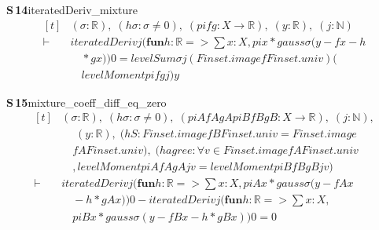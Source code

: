 \documentclass[conference]{IEEEtran}
\theoremstyle{definition}
\newcommand{\lean}[1]{\textsf{\footnotesize #1}}
\begin{document}
\noindent\textbf{S\,14}\quad\lean{iteratedDeriv\_mixture}
{\footnotesize\[ \begin{aligned}[t]
&(\sigma : \mathbb{R} ),\; (\mathit{hσ} : \sigma \neq 0),\; (\mathit{pi} \mathit{f} \mathit{g} : \mathit{X} \to \mathbb{R} ),\; (\mathit{y} : \mathbb{R} ),\; (\mathit{j} : \mathbb{N} )\\
\vdash\;&\mathit{iteratedDeriv} \mathit{j} (\mathbf{fun} \mathit{h} : \mathbb{R} => \textstyle\sum \mathit{x} : \mathit{X}, \mathit{pi} \mathit{x} * \mathit{gauss} \sigma (\mathit{y} - \mathit{f} \mathit{x} - \mathit{h}\\
&\quad * \mathit{g} \mathit{x})) 0 = \mathit{levelSum} \sigma \mathit{j} (\mathit{Finset}.\mathit{image} \mathit{f} \mathit{Finset}.\mathit{univ}) (\\
&\quad \mathit{levelMoment} \mathit{pi} \mathit{f} \mathit{g} \mathit{j}) \mathit{y}
\end{aligned} \]}

\noindent\textbf{S\,15}\quad\lean{mixture\_coeff\_diff\_eq\_zero}
{\footnotesize\[ \begin{aligned}[t]
&(\sigma : \mathbb{R} ),\; (\mathit{hσ} : \sigma \neq 0),\; (\mathit{piA} \mathit{fA} \mathit{gA} \mathit{piB} \mathit{fB} \mathit{gB} : \mathit{X} \to \mathbb{R} ),\; (\mathit{j} : \mathbb{N} ),\\
&\quad \; (\mathit{y} : \mathbb{R} ),\; (\mathit{hS} : \mathit{Finset}.\mathit{image} \mathit{fB} \mathit{Finset}.\mathit{univ} = \mathit{Finset}.\mathit{image}\\
&\quad \mathit{fA} \mathit{Finset}.\mathit{univ}),\; (\mathit{hagree} : \forall \mathit{v} \in \mathit{Finset}.\mathit{image} \mathit{fA} \mathit{Finset}.\mathit{univ}\\
&\quad , \mathit{levelMoment} \mathit{piA} \mathit{fA} \mathit{gA} \mathit{j} \mathit{v} = \mathit{levelMoment} \mathit{piB} \mathit{fB} \mathit{gB} \mathit{j} \mathit{v})\\
\vdash\;&\mathit{iteratedDeriv} \mathit{j} (\mathbf{fun} \mathit{h} : \mathbb{R} => \textstyle\sum \mathit{x} : \mathit{X}, \mathit{piA} \mathit{x} * \mathit{gauss} \sigma (\mathit{y} - \mathit{fA} \mathit{x}\\
&\quad - \mathit{h} * \mathit{gA} \mathit{x})) 0 - \mathit{iteratedDeriv} \mathit{j} (\mathbf{fun} \mathit{h} : \mathbb{R} => \textstyle\sum \mathit{x} : \mathit{X},\\
&\quad \mathit{piB} \mathit{x} * \mathit{gauss} \sigma (\mathit{y} - \mathit{fB} \mathit{x} - \mathit{h} * \mathit{gB} \mathit{x})) 0 = 0
\end{aligned} \]}
\end{document}
